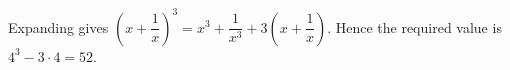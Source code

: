 Expanding gives $(x+\dfrac{1}{x})^3=x^3+\dfrac{1}{x^3}+3(x+\dfrac{1}{x})$. Hence the required value is $4^3-3\cdot4=\boxed{52}$.
